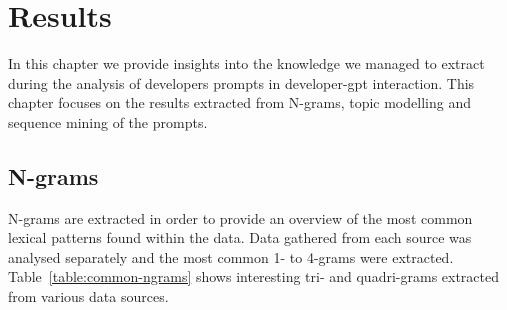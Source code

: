 \chapter{Results}\label{results}
In this chapter we provide insights into the knowledge we managed to extract during the analysis of developers prompts in developer-\acrshort{gpt} interaction. This chapter focuses on the results extracted from N-grams, topic modelling and sequence mining of the prompts. 

\section{N-grams}
N-grams are extracted in order to provide an overview of the most common lexical patterns found within the data. Data gathered from each source was analysed separately and the most common 1- to 4-grams were extracted. Table~\ref{table:common-ngrams} shows interesting tri- and quadri-grams extracted from various data sources. 

